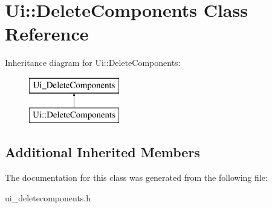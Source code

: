 \hypertarget{classUi_1_1DeleteComponents}{\section{Ui\-:\-:Delete\-Components Class Reference}
\label{classUi_1_1DeleteComponents}
}
Inheritance diagram for Ui\-:\-:Delete\-Components\-:\begin{figure}[H]
\begin{center}
\leavevmode
\includegraphics[height=2.000000cm]{classUi_1_1DeleteComponents}
\end{center}
\end{figure}
\subsection*{Additional Inherited Members}


The documentation for this class was generated from the following file\-:\begin{DoxyCompactItemize}
\item 
ui\-\_\-deletecomponents.\-h\end{DoxyCompactItemize}
